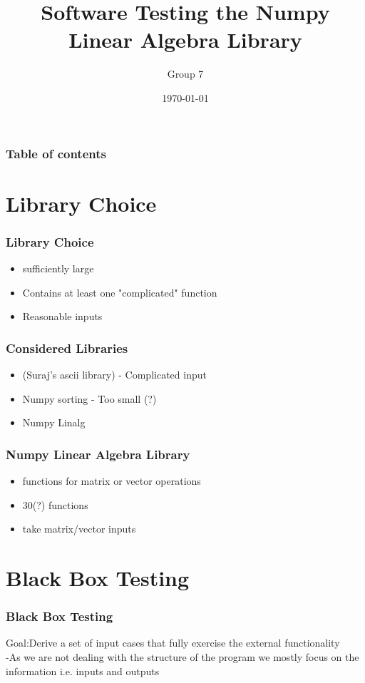 \documentclass{beamer}
\begin{document}
\title{Software Testing the Numpy Linear Algebra Library}  
\author{Group 7}

\date{\today} 
\begin{frame}
\titlepage
\end{frame}

\begin{frame}\frametitle{Table of contents}\tableofcontents
\end{frame} 

\section{Library Choice}
\begin{frame}
\frametitle{Library Choice} 
\begin{itemize}
\item sufficiently large\\
\item Contains at least one "complicated" function\\
\item Reasonable inputs \\
\end{itemize}
\end{frame}

\begin{frame}\frametitle{Considered Libraries} 
\begin{itemize}
\item (Suraj's ascii library) - Complicated input 
\item Numpy sorting - Too small (?)
\item Numpy Linalg 
\end{itemize}
\end{frame}


\begin{frame}\frametitle{Numpy Linear Algebra Library} 
\begin{itemize}

\item functions for matrix or vector operations 
\item 30(?) functions
\item take matrix/vector inputs 
\end{itemize}
\end{frame}

\section{Black Box Testing}
\begin{frame}\frametitle{Black Box Testing} 
Goal:Derive a set of input cases that fully exercise the external functionality\\

-As we are not dealing with the structure of the program we mostly focus on the information i.e. inputs and outputs
\end{frame}
\end{document}
